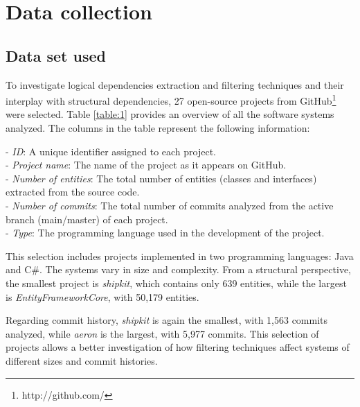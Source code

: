 \section{Data collection}
\label{sec:data_collection}


\subsection{Data set used}
\label{subsec:data_sets_used}

\hspace{4em}To investigate logical dependencies extraction and filtering techniques and their interplay with structural dependencies, 27 open-source projects from GitHub\footnote{http://github.com/} were selected. Table \ref{table:1} provides an overview of all the software systems analyzed. The columns in the table represent the following information:

\hspace{-4em}- \textit{ID}: A unique identifier assigned to each project. \\
- \textit{Project name}: The name of the project as it appears on GitHub. \\
- \textit{Number of entities}: The total number of entities (classes and interfaces) extracted from the source code. \\
- \textit{Number of commits}: The total number of commits analyzed from the active branch (main/master) of each project. \\
- \textit{Type}: The programming language used in the development of the project.


This selection includes projects implemented in two programming languages: Java and C\#. The systems vary in size and complexity. From a structural perspective, the smallest project is \textit{shipkit}, which contains only 639 entities, while the largest is \textit{EntityFrameworkCore}, with 50,179 entities.

Regarding commit history, \textit{shipkit} is again the smallest, with 1,563 commits analyzed, while \textit{aeron} is the largest, with 5,977 commits. This selection of projects allows a better investigation of how filtering techniques affect systems of different sizes and commit histories.


